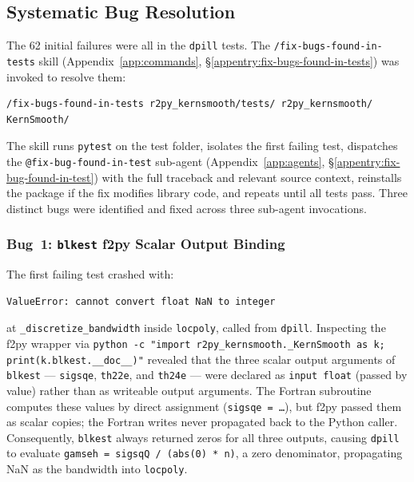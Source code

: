 \documentclass[12pt,a4paper]{article}
\begin{document}
\subsection{Systematic Bug Resolution}

The 62 initial failures were all in the \texttt{dpill} tests. The \texttt{/fix-bugs-found-in-tests} skill (Appendix~\ref{app:commands}, \S\ref{appentry:fix-bugs-found-in-tests}) was invoked to resolve them:

\begin{lstlisting}[style=shell]
/fix-bugs-found-in-tests r2py_kernsmooth/tests/ r2py_kernsmooth/ KernSmooth/
\end{lstlisting}

The skill runs \texttt{pytest} on the test folder, isolates the first failing test, dispatches the \texttt{@fix-bug-found-in-test} sub-agent (Appendix~\ref{app:agents}, \S\ref{appentry:fix-bug-found-in-test}) with the full traceback and relevant source context, reinstalls the package if the fix modifies library code, and repeats until all tests pass. Three distinct bugs were identified and fixed across three sub-agent invocations.

\subsubsection{Bug~1: \texttt{blkest} f2py Scalar Output Binding}
\label{sec:phase7-blkest-bug}

The first failing test crashed with:

\begin{lstlisting}[style=shell]
ValueError: cannot convert float NaN to integer
\end{lstlisting}

at \texttt{\_discretize\_bandwidth} inside \texttt{locpoly}, called from \texttt{dpill}. Inspecting the f2py wrapper via \texttt{python~-c~"import r2py\_kernsmooth.\_KernSmooth as k; print(k.blkest.\_\_doc\_\_)"} revealed that the three scalar output arguments of \texttt{blkest} --- \texttt{sigsqe}, \texttt{th22e}, and \texttt{th24e} --- were declared as \texttt{input float} (passed by value) rather than as writeable output arguments. The Fortran subroutine computes these values by direct assignment (\texttt{sigsqe~=~\ldots}), but f2py passed them as scalar copies; the Fortran writes never propagated back to the Python caller. Consequently, \texttt{blkest} always returned zeros for all three outputs, causing \texttt{dpill} to evaluate \texttt{gamseh~=~sigsqQ~/~(abs(0)~*~n)}, a zero denominator, propagating NaN as the bandwidth into \texttt{locpoly}.
\end{document}
